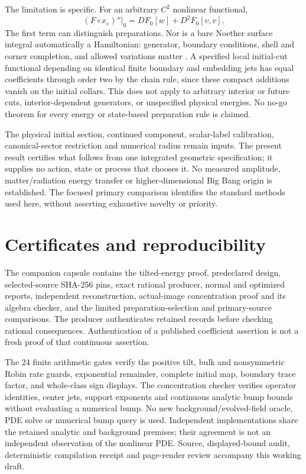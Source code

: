 \documentclass[11pt]{article}
\newcommand{\eps}{\varepsilon}
\begin{document}
The limitation is specific. For an arbitrary $C^2$ nonlinear functional,
\begin{equation}
 (F\circ x_\eps)''|_0=DF_0[w]+D^2F_0[v,v].
 \label{eq:functional}
\end{equation}
The first term can distinguish preparations. Nor is a bare Noether
surface integral automatically a Hamiltonian: generator, boundary
conditions, shell and corner completion, and allowed variations matter
\cite{IW,HarlowWu}. A specified local initial-cut functional depending
on identical finite boundary and embedding jets has equal coefficients
through order two by the chain rule, since these compact additions
vanish on the initial collars. This does not apply to arbitrary
interior or future cuts, interior-dependent generators, or unspecified
physical energies. No no-go theorem for every energy or state-based
preparation rule is claimed.

The physical initial section, continued component, scalar-label
calibration, canonical-sector restriction and numerical radius remain
inputs. The present result certifies what follows from one integrated
geometric specification; it supplies no action, state or process that
chooses it. No measured amplitude, matter/radiation energy transfer or
higher-dimensional Big Bang origin is established. The focused primary
comparison identifies the standard methods used here, without asserting
exhaustive novelty or priority.

\appendix
\section{Certificates and reproducibility}

The companion capsule \cite{records} contains the tilted-energy proof,
predeclared design, selected-source SHA-256 pins, exact rational producer,
normal and optimized reports, independent reconstruction, actual-image
concentration proof and its algebra checker, and the limited
preparation-selection and primary-source comparisons.
The producer authenticates retained records before checking rational
consequences. Authentication of a published coefficient assertion is not
a fresh proof of that continuous assertion.

The 24 finite arithmetic gates verify the positive tilt, bulk and nonsymmetric
Robin rate guards, exponential remainder, complete initial map, boundary
trace factor, and whole-class sign displays. The concentration checker
verifies operator identities, center jets, support exponents and
continuous analytic bump bounds without evaluating a numerical bump.
No new background/evolved-field oracle, PDE solve or numerical bump query
is used. Independent implementations share the retained analytic and
background premises; their agreement is not an independent observation
of the nonlinear PDE. Source, displayed-bound audit, deterministic
compilation receipt and page-render review accompany this working draft.
\end{document}
